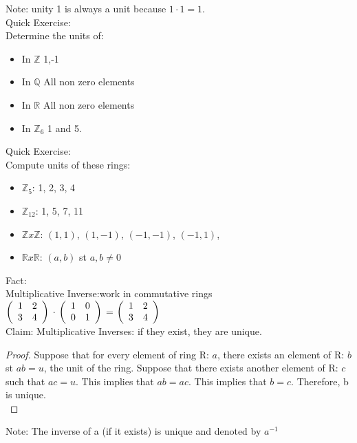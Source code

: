 \documentclass{article}
\newcommand{\Z}{$\mathbb{Z}$}
\theoremstyle{definition}
\theoremstyle{remark}
\begin{document}
Note: unity 1 is always a unit because $1 \cdot 1 = 1$.\\

Quick Exercise:\\
Determine the units of:
\begin{itemize}
\item In \Z
1,-1
\item In $\mathbb{Q}$
All non zero elements
\item In $\mathbb{R}$
All non zero elements
\item In $\mathbb{Z}_6$
1 and 5.
\end{itemize}

Quick Exercise:\\
Compute units of these rings:
\begin{itemize}
\item $\mathbb{Z}_5$: 1, 2, 3, 4
\item $\mathbb{Z}_{12}$: 1, 5, 7, 11
\item $\mathbb{Z}x\mathbb{Z}$: $(1,1)$, $(1,-1)$, $(-1,-1)$, $(-1,1)$,
\item $\mathbb{R}x\mathbb{R}$: $(a,b)$ st $a,b \ne 0$
\end{itemize}

Fact:\\
Multiplicative Inverse:work in commutative rings\\
$\left(\begin{array}{l l}
1 & 2\\
3 & 4\\
\end{array}\right)$
$\cdot$
$\left(\begin{array}{l l}
1 & 0\\
0 & 1\\
\end{array}\right)$
=
$\left(\begin{array}{l l}
1 & 2\\
3 & 4\\
\end{array}\right)$\\

Claim: Multiplicative Inverses: if they exist, they are unique.\\
\begin{proof}
Suppose that for every element of ring R: $a$, there exists an element of R: $b$ st $ab = u$, the unit of the ring. Suppose that there exists another element of R: $c$ such that $ac = u$. This implies that $ab = ac$. This implies that $b = c$. Therefore, b is unique.\\
\end{proof}
Note: The inverse of a (if it exists) is unique and denoted by $a^{-1}$
\end{document}
